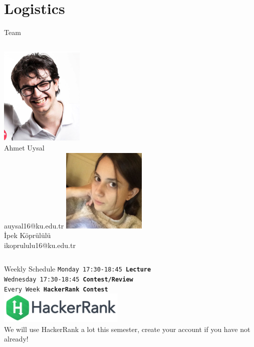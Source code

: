 	\section{Logistics}
		\begin{frame}{Team}
			\begin{columns}
				\column{5cm}
				\centering 
					\includegraphics[width=4.0cm]{images/ahmet.png}\\
					Ahmet Uysal\\
					auysal16@ku.edu.tr
				\pause
				\column{5cm}
				\centering
					\includegraphics[width=4.0cm]{images/ipek.jpeg}\\
					İpek Köprülülü\\
					ikoprululu16@ku.edu.tr
			\end{columns}
		\end{frame}

		\begin{frame}{Weekly Schedule}
			\LARGE
			\texttt{Monday 17:30-18:45 \textbf{Lecture}}\\
			\pause
			\texttt{Wednesday 17:30-18:45 \textbf{Contest/Review}}\\
			\pause  
			\texttt{Every Week \textbf{HackerRank Contest}}\\
			\pause
			\vspace{4mm}
			\centering
			\includegraphics[width=6cm]{images/hackerrank.png}\\
			We will use HackerRank a lot this semester, create your account if you have not already!
		\end{frame}

